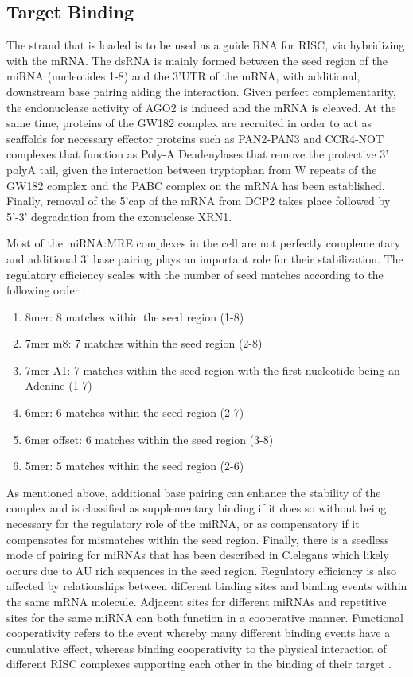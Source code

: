 \documentclass[en,ack]{dimscthesis}
\begin{document}
\subsection{Target Binding} \label{Target Binding}
\par The strand that is loaded is to be used as a guide RNA for RISC, via hybridizing with the mRNA. The dsRNA is mainly formed between the seed region of the miRNA (nucleotides 1-8) and the 3'UTR of the mRNA, with additional, downstream base pairing aiding the interaction. Given perfect complementarity, the endonuclease activity of AGO2 is induced and the mRNA is cleaved. At the same time, proteins of the GW182 complex are recruited in order to act as scaffolds for necessary effector proteins such as PAN2-PAN3 and CCR4-NOT complexes that function as Poly-A Deadenylases that remove the protective 3' polyA tail, given the interaction between tryptophan from W repeats of the GW182 complex and the PABC complex on the mRNA has been established. Finally, removal of the 5'cap of the mRNA from DCP2 takes place followed by 5'-3' degradation from the exonuclease XRN1.

Most of the miRNA:MRE complexes in the cell are not perfectly complementary and additional 3' base pairing plays an important role for their stabilization. The regulatory efficiency scales with the number of seed matches according to the following order \parencite{grimsonMicroRNATargetingSpecificity2007}:

\begin{enumerate}
	\item 8mer: 8 matches within the seed region (1-8)
	\item 7mer m8: 7 matches within the seed region (2-8)
	\item 7mer A1: 7 matches within the seed region with the first nucleotide being an Adenine (1-7)
	\item 6mer: 6 matches within the seed region (2-7)
	\item 6mer offset: 6 matches within the seed region (3-8)
	\item 5mer: 5 matches within the seed region (2-6)
\end{enumerate}

\par As mentioned above, additional base pairing can enhance the stability of the complex and is classified as supplementary binding if it does so without being necessary for the regulatory role of the miRNA, or as compensatory if it compensates for mismatches within the seed region. Finally, there is a seedless mode of pairing for miRNAs that has been described in C.elegans which likely occurs due to AU rich sequences in the seed region. Regulatory efficiency is also affected by relationships between different binding sites and binding events within the same mRNA molecule. Adjacent sites for different miRNAs and repetitive sites for the same miRNA can both function in a cooperative manner. Functional cooperativity refers to the event whereby many different binding events have a cumulative effect, whereas binding cooperativity to the physical interaction of different RISC complexes supporting each other in the binding of their target \parencite{dienerMiRNATargetInteractions2024}.
\end{document}
